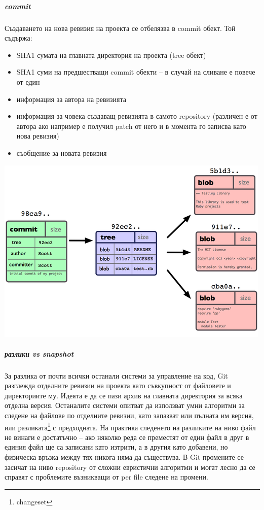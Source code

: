 \documentclass[a4paper]{article}
\begin{document}
      \subparagraph{commit}
      Създаването на нова ревизия на проекта се отбелязва в commit обект. Той съдържа:
      \begin{itemize}
        \item SHA1 сумата на главната директория на проекта (tree обект)
        \item SHA1 суми на предшестващи commit обекти -- в случай на сливане е повече от един
        \item информация за автора на ревизията
        \item информация за човека създаващ ревизията в самото repository
        (различен е от автора ако например е получил patch от него и в момента
        го записва като нова ревизия)
        \item съобщение за новата ревизия
      \end{itemize}

      \begin{center}
        \includegraphics[scale=1.0]{git_commit.png}
      \end{center}

      \subparagraph{разлики vs snapshot} За разлика от почти всички останали
      системи за управление на код, Git разглежда отделните ревизии на проекта
      като съвкупност от файловете и директориите му. Идеята е да се пази архив
      на главната директория за всяка отделна версия. Останалите системи
      опитват да използват умни алгоритми за следене на файлове по отделните
      ревизии, като запазват или пълната им версия, или
      разликата\footnote{changeset} с предходната. На практика следенето на
      разликите на ниво файл не винаги е достатъчно -- ако няколко реда се
      преместят от един файл в друг в единия файл ще са записани като изтрити,
      а в другия като добавени, но физическа връзка между тях никога няма да
      съществува. В Git промените се засичат на ниво repository от сложни
      евристични алгоритми и могат лесно да се справят с проблемите
      възникващи от per file следене на промени.
\end{document}
